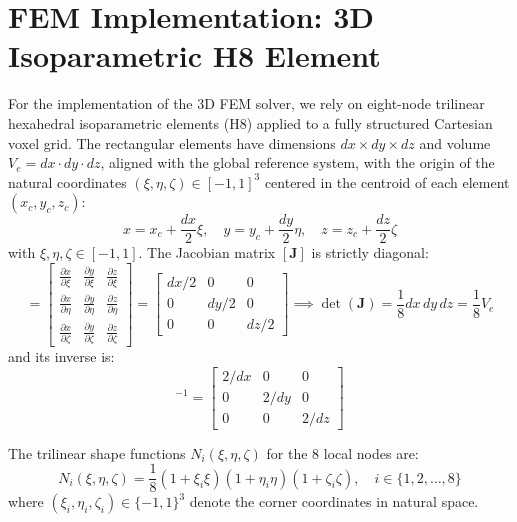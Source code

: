 \documentclass[11pt, a4paper]{article}
\begin{document}
\section{FEM Implementation: 3D Isoparametric H8 Element}
For the implementation of the 3D FEM solver, we rely on eight-node trilinear hexahedral isoparametric elements (H8) applied to a fully structured Cartesian voxel grid. The rectangular elements have dimensions $dx \times dy \times dz$ and volume $V_e = dx \cdot dy \cdot dz$, aligned with the global reference system, with the origin of the natural coordinates $(\xi, \eta, \zeta) \in [-1, 1]^3$ centered in the centroid of each element $(x_c, y_c, z_c)$:
\begin{equation}
x = x_c + \frac{dx}{2}\xi, \quad y = y_c + \frac{dy}{2}\eta, \quad z = z_c + \frac{dz}{2}\zeta
\end{equation}
with $\xi, \eta, \zeta \in [-1, 1]$. The Jacobian matrix $[\mathbf{J}]$ is strictly diagonal:
\begin{equation}
[\mathbf{J}] = \begin{bmatrix}
\frac{\partial x}{\partial \xi} & \frac{\partial y}{\partial \xi} & \frac{\partial z}{\partial \xi} \\[4pt]
\frac{\partial x}{\partial \eta} & \frac{\partial y}{\partial \eta} & \frac{\partial z}{\partial \eta} \\[4pt]
\frac{\partial x}{\partial \zeta} & \frac{\partial y}{\partial \zeta} & \frac{\partial z}{\partial \zeta}
\end{bmatrix} = \begin{bmatrix}
dx/2 & 0 & 0 \\
0 & dy/2 & 0 \\
0 & 0 & dz/2
\end{bmatrix} \implies \det(\mathbf{J}) = \frac{1}{8} dx \, dy \, dz = \frac{1}{8} V_e
\end{equation}
and its inverse is:
\begin{equation}
[\mathbf{J}]^{-1} = \begin{bmatrix}
2/dx & 0 & 0 \\
0 & 2/dy & 0 \\
0 & 0 & 2/dz
\end{bmatrix}
\end{equation}

The trilinear shape functions $N_i(\xi, \eta, \zeta)$ for the 8 local nodes are:
\begin{equation}
N_i(\xi, \eta, \zeta) = \frac{1}{8}(1 + \xi_i \xi)(1 + \eta_i \eta)(1 + \zeta_i \zeta), \quad i \in \{1, 2, \dots, 8\}
\end{equation}
where $(\xi_i, \eta_i, \zeta_i) \in \{-1, 1\}^3$ denote the corner coordinates in natural space.
\end{document}
